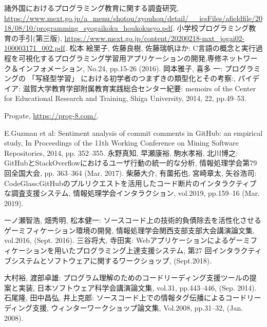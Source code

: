 \begin{thebibliography}{99}
	
	諸外国におけるプログラミング教育に関する調査研究, \url{https://www.mext.go.jp/a_menu/shotou/zyouhou/detail/__icsFiles/afieldfile/2018/08/10/programming_syogaikoku_houkokusyo.pdf}.
	小学校プログラミング教育の手引(第三版), \url{https://www.mext.go.jp/content/20200218-mxt_jogai02-100003171_002.pdf}.
	松本 絵里子, 佐藤良樹, 佐藤瑞帆ほか: C言語の概念と実行過程を可視化するプログラミング学習用アプリケーションの開発,専修ネットワーク＆インフォメーション, No.24, pp.15-26 (2016).
	岡本雅子, 喜多 一: プログラミングの 「写経型学習」 における初学者のつまずきの類型化とその考察:, パイデイア: 滋賀大学教育学部附属教育実践総合センター紀要: memoirs of the Center for Educational Research and Training, Shiga University, 2014, 22, pp.49--53.
	
	Progate, \url{https://prog-8.com/}.



	E.Guzman et al: Sentiment analysis of commit comments in GitHub: an empirical study, In Proceedings of the 11th Working Conference on Mining Software Repositories, 2014, pp. 352--355.
	永野真知, 早瀬康裕, 駒水孝裕, 北川博之: GitHubとStackOverflowにおけるユーザ行動の統一的な分析, 情報処理学会第79回全国大会, pp. 363–364 (Mar. 2017).
	柴藤大介, 有薗拓也, 宮崎章太, 矢谷浩司: CodeGlass:GitHubのプルリクエストを活用したコード断片のインタラクティブな調査支援システム, 情報処理学会インタラクション, vol.2019, pp.159–16 (Mar. 2019).

	一ノ瀬智浩, 畑秀明, 松本健一: ソースコード上の技術的負債除去を活性化させるゲーミフィケーション環境の開発, 情報処理学会関西支部支部大会講演論文集, vol.2016, (Sept. 2016).
	三谷将大, 寺田実: Webアプリケーションによるゲーミフィケーションを用いたプログラミング上達支援システム, 第27 回インタラクティブシステムとソフトウェアに関するワークショップ, (Sept.2018).


	大村裕, 渡部卓雄: プログラム理解のためのコードリーディング支援ツールの提案と実装, 日本ソフトウェア科学会講演論文集, vol.31, pp.443–446, (Sep. 2014).
	石尾隆, 田中昌弘, 井上克郎: ソースコード上での情報タグ伝播によるコードリーディング支援, ウィンターワークショップ論文集, Vol.2008, pp.31–32, (Jan. 2008).


\end{thebibliography}
